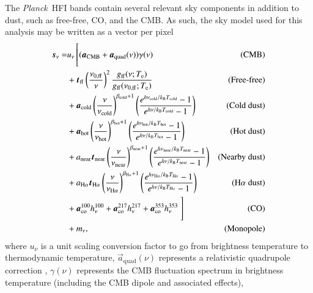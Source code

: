 \documentclass{aa}
\def\planck{\textit{Planck}}
\begin{document}
The \planck\ HFI bands contain several relevant sky components in addition to dust, such as free-free, CO, and the CMB.  
 As such, the sky model used for this analysis may be written as a vector per pixel
\begin{align}
    \vec{s}_\nu=&u_\nu 
    \left[\vphantom{\left(\frac{\nu}{\nu_\mathrm{d}}\right)^{\beta_\mathrm{d}+1}}(\vec{a} _\mathrm{CMB} + \vec{a}_{\mathrm{quad}}(\nu))\gamma(\nu) \right. &\mathrm{(CMB)} \nonumber \\
    &+\vec{t}_\mathrm{ff}\left(\frac{\nu_{0,\mathrm{ff}}}{\nu}\right)^2\frac{g_\mathrm{ff}(\nu;T_\mathrm{e})}{g_\mathrm{ff}(\nu_{0,\mathrm{ff}};T_\mathrm{e})} & \textrm{(Free-free)}\nonumber \\
    &+\vec{a}_\mathrm{cold}\left(\frac{\nu}{\nu_\mathrm{cold}}\right)^{\beta_\mathrm{cold}+1}\left(\frac{e^{h\nu_\mathrm{cold}/k_\mathrm{B}T_\mathrm{cold}}-1}{e^{h\nu/k_\mathrm{B}T_\mathrm{cold}}-1}\right) &\textrm{(Cold\ dust)}\nonumber \\
    &+\vec{a}_\mathrm{hot}\left(\frac{\nu}{\nu_\mathrm{hot}}\right)^{\beta_\mathrm{hot}+1}\left(\frac{e^{h\nu_\mathrm{hot}/k_\mathrm{B}T_\mathrm{hot}}-1}{e^{h\nu/k_\mathrm{B}T_\mathrm{hot}}-1}\right) &\textrm{(Hot\ dust)}\nonumber \\
    &+a_\mathrm{near}\vec{t}_\mathrm{near}\left(\frac{\nu}{\nu_\mathrm{near}}\right)^{\beta_\mathrm{near}+1}\left(\frac{e^{h\nu_\mathrm{near}/k_\mathrm{B}T_\mathrm{near}}-1}{e^{h\nu/k_\mathrm{B}T_\mathrm{near}}-1}\right)&\textrm{(Nearby\ dust)}\nonumber \\
    &+a_\mathrm{H\alpha}\vec{t}_\mathrm{H\alpha}\left(\frac{\nu}{\nu_\mathrm{H\alpha}}\right)^{\beta_\mathrm{H\alpha}+1}\left(\frac{e^{h\nu_\mathrm{H\alpha}/k_\mathrm{B}T_\mathrm{H\alpha}}-1}{e^{h\nu/k_\mathrm{B}T_\mathrm{H\alpha}}-1}\right) &\textrm{(H$\alpha$\ dust)}\nonumber \\
&+\vec{a}^{100}_\mathrm{co}h_\nu^{100}+\vec{a}^{217}_\mathrm{co}h_\nu^{217} +\vec{a}^{353}_\mathrm{co}h_\nu^{353}\left. \vphantom{\left(\frac{\nu}{\nu_\mathrm{d}}\right)^{\beta_\mathrm{d}+1}}\right] & \textrm{(CO)}\nonumber\\
    &+m_\nu, &\textrm{(Monopole)}
\label{equ:model}
\end{align}
where $u_\nu$ is a unit scaling conversion factor to go from brightness temperature to thermodynamic temperature, $\vec{a}_{\mathrm{quad}}(\nu)$ represents a relativistic quadrupole correction \citep{Notari:2015}, $\gamma(\nu)$ represents the CMB fluctuation spectrum in brightness temperature (including the CMB dipole and associated effects),
\end{document}
